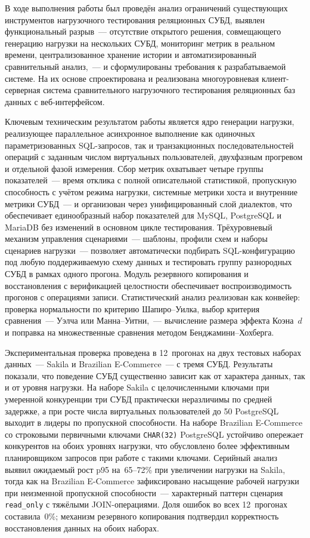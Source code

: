 \conclusion

В ходе выполнения работы был проведён анализ ограничений существующих инструментов нагрузочного тестирования реляционных СУБД, выявлен функциональный разрыв~--- отсутствие открытого решения, совмещающего генерацию нагрузки на нескольких СУБД, мониторинг метрик в реальном времени, централизованное хранение истории и автоматизированный сравнительный анализ,~--- и сформулированы требования к разрабатываемой системе. На их основе спроектирована и реализована многоуровневая клиент-серверная система сравнительного нагрузочного тестирования реляционных баз данных с веб-интерфейсом.

Ключевым техническим результатом работы является ядро генерации нагрузки, реализующее параллельное асинхронное выполнение как одиночных параметризованных SQL-запросов, так и транзакционных последовательностей операций с заданным числом виртуальных пользователей, двухфазным прогревом и отдельной фазой измерения. Сбор метрик охватывает четыре группы показателей~--- время отклика с полной описательной статистикой, пропускную способность с учётом режима нагрузки, системные метрики хоста и внутренние метрики СУБД~--- и организован через унифицированный слой диалектов, что обеспечивает единообразный набор показателей для MySQL, PostgreSQL и MariaDB без изменений в основном цикле тестирования. Трёхуровневый механизм управления сценариями~--- шаблоны, профили схем и наборы сценариев нагрузки~--- позволяет автоматически подбирать SQL-конфигурацию под любую поддерживаемую схему данных и тестировать группу разнородных СУБД в рамках одного прогона. Модуль резервного копирования и восстановления с верификацией целостности обеспечивает воспроизводимость прогонов с операциями записи. Статистический анализ реализован как конвейер: проверка нормальности по критерию Шапиро--Уилка, выбор критерия сравнения~--- Уэлча или Манна--Уитни,~--- вычисление размера эффекта Коэна~$d$ и поправка на множественные сравнения методом Бенджамини--Хохберга.

Экспериментальная проверка проведена в 12~прогонах на двух тестовых наборах данных~--- Sakila и Brazilian E-Commerce~--- с тремя СУБД. Результаты показали, что поведение СУБД существенно зависит как от характера данных, так и от уровня нагрузки. На наборе Sakila с целочисленными ключами при умеренной конкуренции три СУБД практически неразличимы по средней задержке, а при росте числа виртуальных пользователей до 50 PostgreSQL выходит в лидеры по пропускной способности. На наборе Brazilian E-Commerce со строковыми первичными ключами \texttt{CHAR(32)} PostgreSQL устойчиво опережает конкурентов на обоих уровнях нагрузки, что обусловлено более эффективным планировщиком запросов при работе с такими ключами. Серийный анализ выявил ожидаемый рост p95 на~65--72\% при увеличении нагрузки на Sakila, тогда как на Brazilian E-Commerce зафиксировано насыщение рабочей нагрузки при неизменной пропускной способности~--- характерный паттерн сценария \texttt{read\_only} с тяжёлыми JOIN-операциями. Доля ошибок во всех 12~прогонах составила~0\%; механизм резервного копирования подтвердил корректность восстановления данных на обоих наборах.

